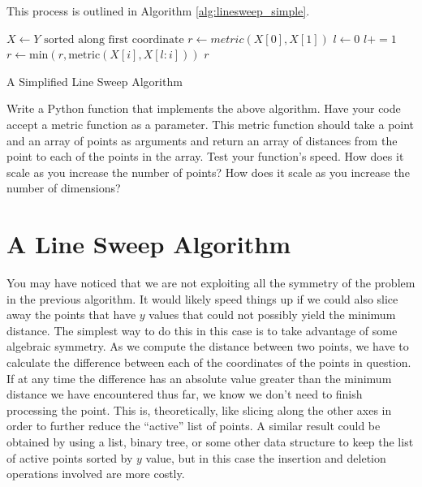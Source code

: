 This process is outlined in Algorithm \ref{alg:linesweep_simple}.
\begin{algorithm}
\begin{algorithmic}[1]
	\State $X \gets Y \text{ sorted along first coordinate}$
	\State $r \gets metric\left(X\left[0\right], X\left[1\right]\right)$
	\State $l \gets 0$
			\State $l += 1$
		\EndWhile
			\State $r \gets \text{min}\left(r, \text{metric}\left(X\left[i\right], X\left[l:i\right]\right)\right)$
		\EndIf
	\EndFor
	\State {} $r$
\EndProcedure
\end{algorithmic}
\caption{A Simplified Line Sweep Algorithm}
\label{alg:linesweep_simple}
\end{algorithm}

\begin{problem}
Write a Python function that implements the above algorithm.
Have your code accept a metric function as a parameter.
This metric function should take a point and an array of points as arguments and return an array of distances from the point to each of the points in the array. 
Test your function's speed. 
How does it scale as you increase the number of points? 
How does it scale as you increase the number of dimensions?
\end{problem}

\section*{A Line Sweep Algorithm}

You may have noticed that we are not exploiting all the symmetry of the problem in the previous algorithm. 
It would likely speed things up if we could also slice away the points that have $y$ values that could not possibly yield the minimum distance. 
The simplest way to do this in this case is to take advantage of some algebraic symmetry.
As we compute the distance between two points, we have to calculate the difference between each of the coordinates of the points in question. 
If at any time the difference has an absolute value greater than the minimum distance we have encountered thus far, we know we don't need to finish processing the point.
This is, theoretically, like slicing along the other axes in order to further reduce the ``active'' list of points.
A similar result could be obtained by using a list, binary tree, or some other data structure to keep the list of active points sorted by $y$ value, but in this case the insertion and deletion operations involved are more costly.

